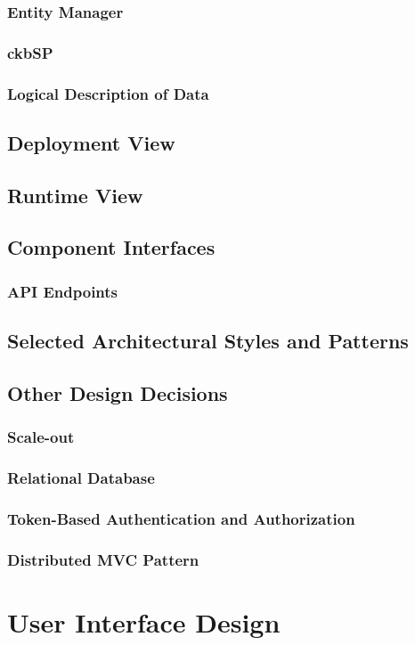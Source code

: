 \documentclass[a4paper,12pt]{article}
\begin{document}
\subsubsection{Entity Manager}
\subsubsection{ckbSP}
\subsubsection{Logical Description of Data}
\subsection{Deployment View}
\subsection{Runtime View}
\subsection{Component Interfaces}
\subsubsection{API Endpoints}
\subsection{Selected Architectural Styles and Patterns}
\subsection{Other Design Decisions}
\subsubsection{Scale-out}
\subsubsection{Relational Database}
\subsubsection{Token-Based Authentication and Authorization}
\subsubsection{Distributed MVC Pattern}

\section{User Interface Design}
\end{document}
